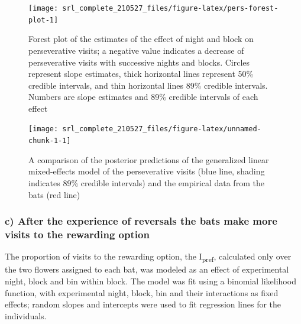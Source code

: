 \documentclass[
]{article}
\begin{document}
\begin{figure}[H]

{\centering \texttt{[image: srl\_complete\_210527\_files/figure-latex/pers-forest-plot-1]} 

}

\caption{Forest plot of the estimates of the effect of night and block on perseverative visits; a negative value indicates a decrease of perseverative visits with successive nights and blocks. Circles represent slope estimates, thick horizontal lines represent 50\% credible intervals, and thin horizontal lines 89\% credible intervals. Numbers are slope estimates and 89\% credible intervals of each effect}\label{fig:pers-forest-plot}
\end{figure}



\begin{figure}[H]

{\centering \texttt{[image: srl\_complete\_210527\_files/figure-latex/unnamed-chunk-1-1]} 

}

\caption{A comparison of the posterior predictions of the generalized linear mixed-effects model of the perseverative visits (blue line, shading indicates 89\% credible intervals) and the empirical data from the bats (red line)}\label{fig:unnamed-chunk-1}
\end{figure}

\hypertarget{c-after-the-experience-of-reversals-the-bats-make-more-visits-to-the-rewarding-option}{%
\subsubsection{c) After the experience of reversals the bats make more visits to the rewarding option}\label{c-after-the-experience-of-reversals-the-bats-make-more-visits-to-the-rewarding-option}}

The proportion of visits to the rewarding option, the I\textsubscript{pref}, calculated only over the two flowers assigned to each bat, was modeled as an effect of experimental night, block and bin within block. The model was fit using a binomial likelihood function, with experimental night, block, bin and their interactions as fixed effects; random slopes and intercepts were used to fit regression lines for the individuals.
\end{document}
